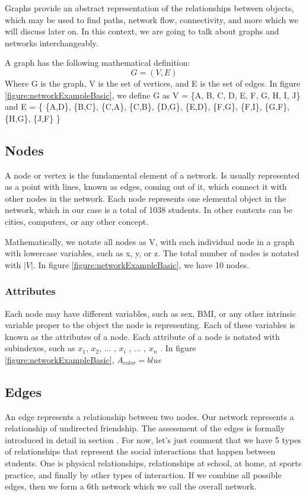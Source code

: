Graphs provide an abstract representation of the relationships between objects, which may be used to find paths, network flow, connectivity, and more which we will discuss later on. In this context, we are going to talk about graphs and networks interchangeably. 

A graph has the following mathematical definition: \label{eq:graph}
    \begin{equation}
        G = (V,E) 
    \end{equation}
Where G is the graph, V is the set of vertices, and E is the set of edges. In figure \ref{figure:networkExampleBasic}, we define G as V = \{A, B, C, D, E, F, G, H, I, J\} and E = \{ \{A,D\}, \{B,C\}, \{C,A\}, \{C,B\}, \{D,G\}, \{E,D\}, \{F,G\}, \{F,I\}, \{G,F\}, \{H,G\}, \{J,F\} \}

\subsection{ Nodes }

A node or vertex is the fundamental element of a network. Is usually represented as a point with lines, known as edges, coming out of it, which connect it with other nodes in the network. Each node represents one elemental object in the network, which in our case is a total of 1038 students. In other contexts can be cities, computers, or any other concept.

Mathematically, we notate all nodes as V, with each individual node in a graph with lowercase variables, such as x, y, or z. The total number of nodes is notated with $|V|$. In figure \ref{figure:networkExampleBasic}, we have 10 nodes.

\subsubsection{Attributes}

Each node may have different variables, such as sex, BMI, or any other intrinsic variable proper to the object the node is representing. Each of these variables is known as the attributes of a node. Each attribute of a node is notated with subindexes, such as $x_1$, $x_2$, ... , $x_i$ , ... , $x_n$ . In figure \ref{figure:networkExampleBasic}, $A_{color} = blue$

\subsection{Edges}

An edge represents a relationship between two nodes. Our network represents a relationship of undirected friendship. The assessment of the edges is formally introduced in detail in section \cite{method:SocialNetwork}. For now, let's just comment that we have 5 types of relationships that represent the social interactions that happen between students. One is physical relationships, relationships at school, at home, at sports practice, and finally by other types of interaction. If we combine all possible edges, then we form a 6th network which we call the overall network.

